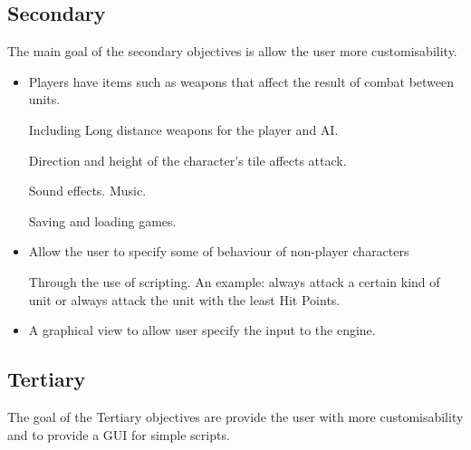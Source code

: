 \subsection{Secondary}
\label{secondary}
The main goal of the secondary objectives is allow the user more customisability. 
\begin{itemize}
	\tick Tiles have \texttt{height}, where units can only move to tiles of a smilier height.
	\cross Tiles that are not passable such as sea, lava, etc.
	
	\tick Tiles have different movement costs associated with them.
	
	\item Players have items such as weapons that affect the result of combat between units. 
	\begin{itemize}
		\tick Including  Long distance weapons for the  player and AI.
	\end{itemize}
	
	\cross Direction and height of the character's tile affects attack.
	
	\tick Sound effects.
	\tick Music.
	
	\cross Saving and loading games.
	
	\item Allow the user to specify some of behaviour of non-player characters
	\begin{itemize}
		\cross Through the use of scripting.
		\cross An example: always attack a certain kind of unit or always attack the unit with the least Hit Points.
	\end{itemize}
	
	\item A graphical view to allow user specify the input to the engine.
\end{itemize}

\subsection{Tertiary} 
\label{tertiary}
The goal of the Tertiary objectives are provide the user with more customisability and to provide a GUI for simple scripts. 

